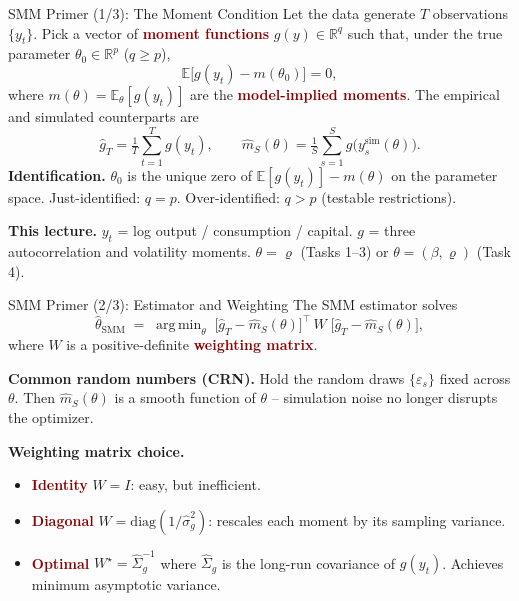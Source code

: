 \documentclass[10pt,aspectratio=169]{beamer}
\newcommand{\emphc}[1]{\textbf{\textcolor{darkred}{#1}}}
\DeclareMathOperator*{\argmin}{arg\,min}
\begin{document}
\begin{frame}{SMM Primer (1/3): The Moment Condition}
\small
Let the data generate $T$ observations $\{y_t\}$. Pick a vector of \emphc{moment functions} $g(y) \in \mathbb{R}^{q}$ such that, under the true parameter $\theta_0 \in \mathbb{R}^{p}$ ($q \geq p$),
\[
    \mathbb{E}\bigl[g(y_t) - m(\theta_0)\bigr] = 0,
\]
where $m(\theta) = \mathbb{E}_\theta[g(y_t)]$ are the \emphc{model-implied moments}. The empirical and simulated counterparts are
\[
    \widehat g_T = \tfrac{1}{T}\sum_{t=1}^{T} g(y_t), \qquad
    \widehat m_S(\theta) = \tfrac{1}{S}\sum_{s=1}^{S} g\bigl(y_s^{\text{sim}}(\theta)\bigr).
\]
\textbf{Identification.} $\theta_0$ is the unique zero of $\mathbb{E}[g(y_t)] - m(\theta)$ on the parameter space. Just-identified: $q = p$. Over-identified: $q > p$ (testable restrictions).

\vspace{0.2em}
\textbf{This lecture.} $y_t$ = log output / consumption / capital. $g$ = three autocorrelation and volatility moments. $\theta = \varrho$ (Tasks 1--3) or $\theta = (\beta, \varrho)$ (Task 4).
\end{frame}

\begin{frame}{SMM Primer (2/3): Estimator and Weighting}
\small
The SMM estimator solves
\[
    \widehat\theta_{\text{SMM}} \;=\; \argmin_{\theta} \;
        \bigl[\widehat g_T - \widehat m_S(\theta)\bigr]^{\!\top}\, W \;
        \bigl[\widehat g_T - \widehat m_S(\theta)\bigr],
\]
where $W$ is a positive-definite \emphc{weighting matrix}.

\vspace{0.3em}
\textbf{Common random numbers (CRN).} Hold the random draws $\{\varepsilon_s\}$ fixed across $\theta$. Then $\widehat m_S(\theta)$ is a smooth function of $\theta$ -- simulation noise no longer disrupts the optimizer.

\vspace{0.3em}
\textbf{Weighting matrix choice.}
\begin{itemize}\itemsep1pt
    \item \emphc{Identity} $W = I$: easy, but inefficient.
    \item \emphc{Diagonal} $W = \mathrm{diag}(1/\widehat\sigma_g^2)$: rescales each moment by its sampling variance.
    \item \emphc{Optimal} $W^\star = \widehat\Sigma_g^{-1}$ where $\widehat\Sigma_g$ is the long-run covariance of $g(y_t)$. Achieves minimum asymptotic variance.
\end{itemize}
\end{frame}
\end{document}
